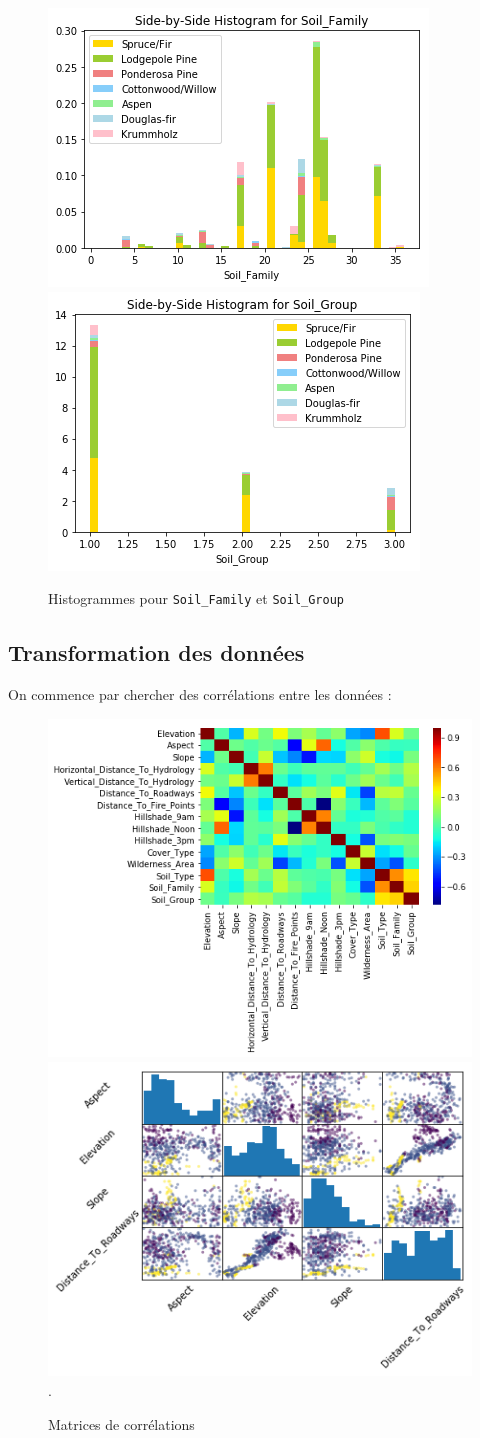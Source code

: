\documentclass[12pt,a4paper]{article}
\numberwithin{equation}{section}
\begin{document}
	\begin{figure}[h]
		\centering
		\hfill
		\includegraphics[width=0.35\linewidth]{img/soil_family}
		\hfill
		\includegraphics[width=0.35\linewidth]{img/soil_group}
		\hfill
		\label{fig:soilhist}
		\caption{Histogrammes pour \texttt{Soil\_Family} et \texttt{Soil\_Group}}
	\end{figure}
	
	\pagebreak
	
	\subsection{Transformation des données}
	On commence par chercher des corrélations entre les données :
	
	\begin{figure}[h]
		\centering
		\includegraphics[width=.48\linewidth]{img/corr_matrix}
		\hfill
		\includegraphics[width=.5\linewidth]{img/scatter_matrix}.
		\caption{Matrices de corrélations}
	\end{figure}
	
\end{document}
